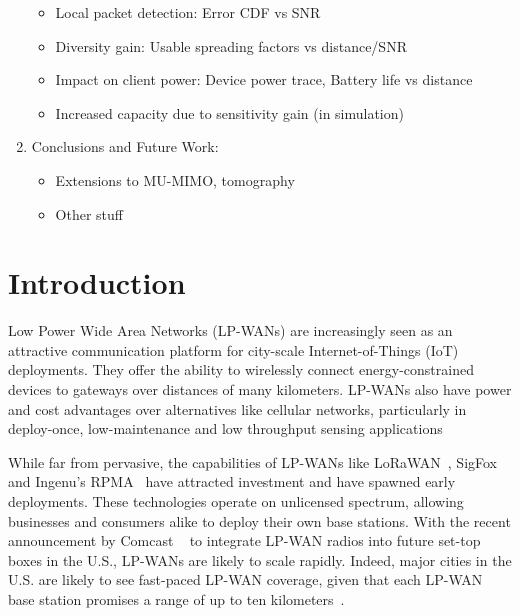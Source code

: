 \begin{enumerate}
        \begin{itemize}
            \item Local packet detection: Error CDF vs SNR
            \item Diversity gain: Usable spreading factors vs distance/SNR
            \item Impact on client power: Device power trace, Battery life vs distance
            \item Increased capacity due to sensitivity gain (in simulation)
        \end{itemize}
    \item Conclusions and Future Work:
        \begin{itemize}
            \item Extensions to MU-MIMO, tomography
            \item Other stuff
        \end{itemize}
\end{enumerate}



\section{Introduction}
\label{sec:intro}


Low Power Wide Area Networks (LP-WANs) are increasingly seen as an attractive communication platform for city-scale Internet-of-Things (IoT) deployments.
They offer the ability to wirelessly connect energy-constrained devices to gateways over distances of many kilometers.
LP-WANs also have power and cost advantages over alternatives like cellular networks, particularly in deploy-once, low-maintenance and low throughput sensing applications

While far from pervasive, the capabilities of LP-WANs like LoRaWAN~\cite{Sornin2015, LoRaWanAlliance2015}, SigFox~\cite{centenaro2016} and Ingenu's RPMA~\cite{Ingenu2015} have attracted investment and have spawned early deployments. 
These technologies operate on unlicensed spectrum, allowing businesses and consumers alike to deploy their own base stations.
With the recent announcement by Comcast {\color{red}~\cite{}} to integrate LP-WAN radios into future set-top boxes in the U.S., LP-WANs are likely to scale rapidly.
Indeed, major cities in the U.S. are likely to see fast-paced LP-WAN coverage, given that each LP-WAN base station promises a range of up to ten kilometers~\cite{LoRaWanAlliance2015}. 


